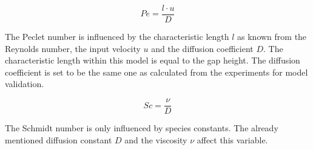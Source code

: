 \documentclass[../thesis.tex]{subfiles}
\begin{document}
\begin{equation}
	\label{eqn: Pe}
	Pe = \dfrac{l \cdot u}{D}
\end{equation}

The Peclet number is influenced by the characteristic length $l$ as known from the Reynolds number, the input velocity $u$ and the diffusion coefficient $D$. The characteristic length within this model is equal to the gap height. The diffusion coefficient is set to be the same one as calculated from the experiments for model validation. 

\begin{equation}
	\label{eqn: Sc}
	Sc = \dfrac{\nu}{D}
\end{equation}

The Schmidt number is only influenced by species constants. The already mentioned diffusion constant $D$ and the viscosity $\nu$ affect this variable.
\end{document}
